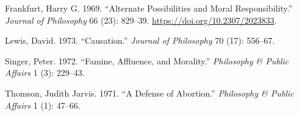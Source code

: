 \documentclass[
  12pt,
  letterpaper,
  DIV=11,
  numbers=noendperiod]{scrartcl}
\newlength{\cslhangindent}
\newenvironment{CSLReferences}[2] %
 {\begin{list}{}{%
  \setlength{\itemindent}{0pt}
  \setlength{\leftmargin}{0pt}
  \setlength{\parsep}{0pt}
  \ifodd #1
   \setlength{\leftmargin}{\cslhangindent}
   \setlength{\itemindent}{-1\cslhangindent}
  \fi
  \setlength{\itemsep}{#2\baselineskip}}}
 {\end{list}}
\begin{document}
\label{refs}
\begin{CSLReferences}{1}{0}
Frankfurt, Harry G. 1969. {``Alternate Possibilities and Moral
Responsibility.''} \emph{Journal of Philosophy} 66 (23): 829--39.
\url{https://doi.org/10.2307/2023833}.

Lewis, David. 1973. {``Causation.''} \emph{Journal of Philosophy} 70
(17): 556--67.

Singer, Peter. 1972. {``Famine, Affluence, and Morality.''}
\emph{Philosophy \& Public Affairs} 1 (3): 229--43.

Thomson, Judith Jarvis. 1971. {``A Defense of Abortion.''}
\emph{Philosophy \& Public Affairs} 1 (1): 47--66.

\end{CSLReferences}
\end{document}
